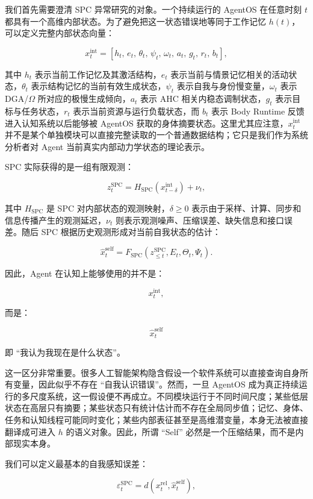 我们首先需要澄清 SPC 异常研究的对象。一个持续运行的 AgentOS 在任意时刻 $t$ 都具有一个高维内部状态。为了避免把这一状态错误地等同于工作记忆 $h(t)$，可以定义完整内部状态向量：

\[
x_t^{\mathrm{int}}
=
\left[
h_t,\,
e_t,\,
\theta_t,\,
\psi_t,\,
\omega_t,\,
a_t,\,
g_t,\,
r_t,\,
b_t
\right],
\]

其中 $h_t$ 表示当前工作记忆及其激活结构，$e_t$ 表示当前与情景记忆相关的活动状态，$\theta_t$ 表示结构记忆的当前有效生成状态，$\psi_t$ 表示自我与身份慢变量，$\omega_t$ 表示 DGA/$\Omega$ 所对应的极慢生成倾向，$a_t$ 表示 AHC 相关内稳态调制状态，$g_t$ 表示目标与任务状态，$r_t$ 表示当前资源与运行负载状态，而 $b_t$ 表示 Body Runtime 反馈进入认知系统以后能够被 AgentOS 获取的身体摘要状态。这里尤其应注意，$x_t^{\mathrm{int}}$ 并不是某个单独模块可以直接完整读取的一个普通数据结构；它只是我们作为系统分析者对 Agent 当前真实内部动力学状态的理论表示。

SPC 实际获得的是一组有限观测：

\[
z_t^{\mathrm{SPC}}
=
H_{\mathrm{SPC}}
\left(
x_{t-\delta}^{\mathrm{int}}
\right)
+
\nu_t,
\]

其中 $H_{\mathrm{SPC}}$ 是 SPC 对内部状态的观测映射，$\delta\geq 0$ 表示由于采样、计算、同步和信息传播产生的观测延迟，$\nu_t$ 则表示观测噪声、压缩误差、缺失信息和接口误差。随后 SPC 根据历史观测形成对当前自我状态的估计：

\[
\hat{x}_t^{\mathrm{self}}
=
F_{\mathrm{SPC}}
\left(
z_{\leq t}^{\mathrm{SPC}},
E_t,
\Theta_t,
\Psi_t
\right).
\]

因此，Agent 在认知上能够使用的并不是：

\[
x_t^{\mathrm{int}},
\]

而是：

\[
\boxed{
\hat{x}_t^{\mathrm{self}}
}
\]

即 ``我认为我现在是什么状态''。

这一区分非常重要。很多人工智能架构隐含假设一个软件系统可以直接查询自身所有变量，因此似乎不存在 ``自我认识错误''。然而，一旦 AgentOS 成为真正持续运行的多尺度系统，这一假设便不再成立。不同模块运行于不同时间尺度；某些低层状态在高层只有摘要；某些状态只有统计估计而不存在全局同步值；记忆、身体、任务和认知线程可能同时变化；某些内部表征甚至是高维潜变量，本身无法被直接翻译成可进入 $h$ 的语义对象。因此，所谓 ``Self'' 必然是一个压缩结果，而不是内部现实本身。

我们可以定义最基本的自我感知误差：

\[
\varepsilon_t^{\mathrm{SPC}}
=
d
\left(
x_t^{\mathrm{rel}},
\hat{x}_t^{\mathrm{self}}
\right),
\]

